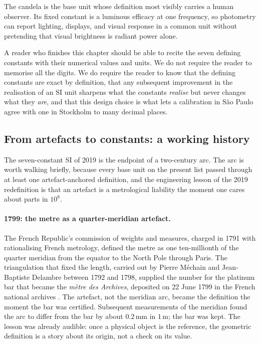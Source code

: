 The candela is the base unit whose definition most visibly carries a
human observer. Its fixed constant is a luminous efficacy at one
frequency, so photometry can report lighting, displays, and visual
response in a common unit without pretending that visual brightness
is radiant power alone.

A reader who finishes this chapter should be able to recite the seven
defining constants with their numerical values and units. We do not
require the reader to memorise all the digits. We do require the
reader to know that the defining constants are exact by definition,
that any subsequent improvement in the realisation of an SI unit
sharpens what the constants \emph{realise} but never changes what
they \emph{are}, and that this design choice is what lets a
calibration in S\~ao Paulo agree with one in Stockholm to many
decimal places.

\subsection{From artefacts to constants: a working history}

The seven-constant SI of 2019 is the endpoint of a two-century arc.
The arc is worth walking briefly, because every base unit on the
present list passed through at least one artefact-anchored definition,
and the engineering lesson of the 2019 redefinition is that an
artefact is a metrological liability the moment one cares about
parts in $10^{8}$.

\paragraph{1799: the metre as a quarter-meridian artefact.} The
French Republic's commission of weights and measures, charged in
1791 with rationalising French metrology, defined the metre as one
ten-millionth of the quarter meridian from the equator to the North
Pole through Paris. The triangulation that fixed the length, carried
out by Pierre M\'echain and Jean-Baptiste Delambre between 1792 and
1798, supplied the number for the platinum bar that became the
\emph{m\`etre des Archives}, deposited on 22 June 1799 in the
French national archives \cite{hist:ch02t3-prototype-metre-1799}.
The artefact, not the meridian arc, became the definition the
moment the bar was certified. Subsequent measurements of the
meridian found the arc to differ from the bar by about
$0.2 \,\si{\milli\meter}$ in $1 \,\si{\meter}$; the bar was kept.
The lesson was already audible: once a physical object is the
reference, the geometric definition is a story about its origin,
not a check on its value.

